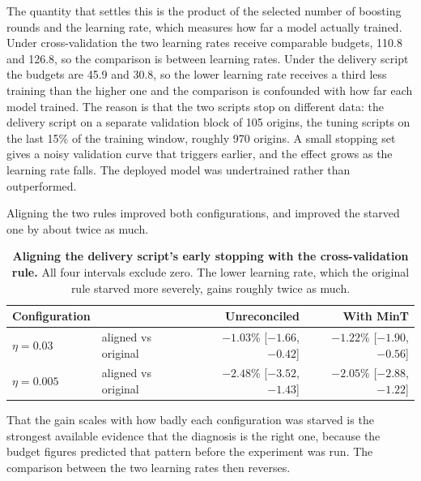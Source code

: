 The quantity that settles this is the product of the selected number of boosting rounds and
the learning rate, which measures how far a model actually trained. Under cross-validation
the two learning rates receive comparable budgets, 110.8 and 126.8, so the comparison is
between learning rates. Under the delivery script the budgets are 45.9 and 30.8, so the
lower learning rate receives a third less training than the higher one and the comparison is
confounded with how far each model trained. The reason is that the two scripts stop on
different data: the delivery script on a separate validation block of 105 origins, the
tuning scripts on the last 15\% of the training window, roughly 970 origins. A small
stopping set gives a noisy validation curve that triggers earlier, and the effect grows as
the learning rate falls. The deployed model was undertrained rather than outperformed.

Aligning the two rules improved both configurations, and improved the starved one by about
twice as much.

\begin{table}[htp]
\centering
\begin{tabular}{llrr}
\toprule
{\bf Configuration} & & {\bf Unreconciled} & {\bf With MinT} \\
\midrule
$\eta = 0.03$ & aligned vs original & $-1.03$\% [$-1.66$, $-0.42$] & $-1.22$\% [$-1.90$, $-0.56$] \\
$\eta = 0.005$ & aligned vs original & $-2.48$\% [$-3.52$, $-1.43$] & $-2.05$\% [$-2.88$, $-1.22$] \\
\bottomrule
\end{tabular}
\caption[Effect of aligning early stopping]{\textbf{Aligning the delivery script's early
stopping with the cross-validation rule.} All four intervals exclude zero. The lower
learning rate, which the original rule starved more severely, gains roughly twice as much.}
\label{tab:esfix}
\end{table}

That the gain scales with how badly each configuration was starved is the strongest
available evidence that the diagnosis is the right one, because the budget figures predicted
that pattern before the experiment was run. The comparison between the two learning rates
then reverses.

